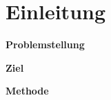 \section{Einleitung}
\label{sec:einleitung}
\textbf{Problemstellung}\vspace{1mm}\\
\lipsum[1]

\textbf{Ziel}\vspace{1mm}\\
\lipsum[1-2]

\clearpage
\textbf{Methode}\vspace{1mm}\\
\lipsum[1]

\clearpage